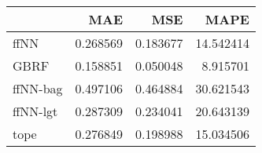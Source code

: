 \begin{tabular}{lrrr}
\toprule
{} &       MAE &       MSE &       MAPE \\
\midrule
ffNN     &  0.268569 &  0.183677 &  14.542414 \\
GBRF     &  0.158851 &  0.050048 &   8.915701 \\
ffNN-bag &  0.497106 &  0.464884 &  30.621543 \\
ffNN-lgt &  0.287309 &  0.234041 &  20.643139 \\
tope     &  0.276849 &  0.198988 &  15.034506 \\
\bottomrule
\end{tabular}
